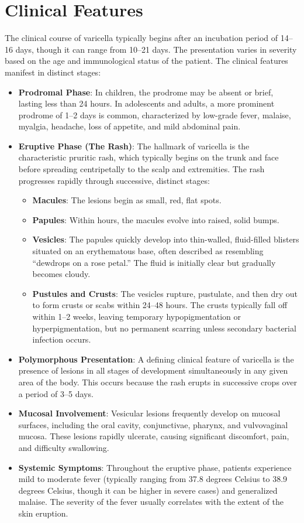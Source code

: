 \section*{Clinical Features}
The clinical course of varicella typically begins after an incubation period of 14--16 days, though it can range from 10--21 days. The presentation varies in severity based on the age and immunological status of the patient. The clinical features manifest in distinct stages:

\begin{itemize}
    \item \textbf{Prodromal Phase}: In children, the prodrome may be absent or brief, lasting less than 24 hours. In adolescents and adults, a more prominent prodrome of 1--2 days is common, characterized by low-grade fever, malaise, myalgia, headache, loss of appetite, and mild abdominal pain.
    \item \textbf{Eruptive Phase (The Rash)}: The hallmark of varicella is the characteristic pruritic rash, which typically begins on the trunk and face before spreading centripetally to the scalp and extremities. The rash progresses rapidly through successive, distinct stages:
    \begin{itemize}
        \item \textbf{Macules}: The lesions begin as small, red, flat spots.
        \item \textbf{Papules}: Within hours, the macules evolve into raised, solid bumps.
        \item \textbf{Vesicles}: The papules quickly develop into thin-walled, fluid-filled blisters situated on an erythematous base, often described as resembling ``dewdrops on a rose petal.'' The fluid is initially clear but gradually becomes cloudy.
        \item \textbf{Pustules and Crusts}: The vesicles rupture, pustulate, and then dry out to form crusts or scabs within 24--48 hours. The crusts typically fall off within 1--2 weeks, leaving temporary hypopigmentation or hyperpigmentation, but no permanent scarring unless secondary bacterial infection occurs.
    \end{itemize}
    \item \textbf{Polymorphous Presentation}: A defining clinical feature of varicella is the presence of lesions in all stages of development simultaneously in any given area of the body. This occurs because the rash erupts in successive crops over a period of 3--5 days.
    \item \textbf{Mucosal Involvement}: Vesicular lesions frequently develop on mucosal surfaces, including the oral cavity, conjunctivae, pharynx, and vulvovaginal mucosa. These lesions rapidly ulcerate, causing significant discomfort, pain, and difficulty swallowing.
    \item \textbf{Systemic Symptoms}: Throughout the eruptive phase, patients experience mild to moderate fever (typically ranging from 37.8 degrees Celsius to 38.9 degrees Celsius, though it can be higher in severe cases) and generalized malaise. The severity of the fever usually correlates with the extent of the skin eruption.
\end{itemize}

